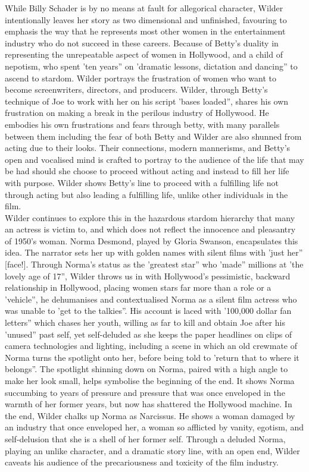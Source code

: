 \documentclass[a4paper]{article}
\begin{document}
While Billy Schader is by no means at fault for allegorical character, Wilder intentionally leaves her story as two dimensional and unfinished, favouring to emphasis the way that he represents most other women in the entertainment industry who do not succeed in these careers. Because of Betty’s duality in representing the unrepeatable aspect of women in Hollywood, and a child of nepotism, who spent 'ten years” on 'dramatic lessons, dictation and dancing” to ascend to stardom. Wilder portrays the frustration of women who want to become screenwriters, directors, and producers. Wilder, through Betty’s technique of Joe to work with her on his script 'bases loaded”, shares his own frustration on making a break in the perilous industry of Hollywood. He embodies his own frustrations and fears through betty, with many parallels between them including the fear of both Betty and Wilder are also shunned from acting due to their looks. Their connections, modern mannerisms, and Betty’s open and vocalised mind is crafted to portray to the audience of the life that may be had should she choose to proceed without acting and instead to fill her life with purpose. Wilder shows Betty’s line to proceed with a fulfilling life not through acting but also leading a fulfilling life, unlike other individuals in the film.\\

Wilder continues to explore this in the hazardous stardom hierarchy that many an actress is victim to, and which does not reflect the innocence and pleasantry of 1950’s woman. Norma Desmond, played by Gloria Swanson, encapsulates this idea. The narrator sets her up with golden names with silent films with 'just her” [face!]. Through Norma’s status as the 'greatest star” who 'made” millions at 'the lovely age of 17”, Wilder throws us in with Hollywood’s pessimistic, backward relationship in Hollywood, placing women stars far more than a role or a 'vehicle”, he dehumanises and contextualised Norma as a silent film actress who was unable to 'get to the talkies”. His account is laced with '100,000 dollar fan letters” which chases her youth, willing as far to kill and obtain Joe after his 'unused” past self, yet self-deluded as she keeps the paper headlines on clips of camera technologies and lighting, including a scene in which an old crewmate of Norma turns the spotlight onto her, before being told to 'return that to where it belongs”. The spotlight shinning down on Norma, paired with a high angle to make her look small, helps symbolise the beginning of the end. It shows Norma succumbing to years of pressure and pressure that was once enveloped in the warmth of her former years, but now has shattered the Hollywood machine. In the end, Wilder chalks up Norma as Narcissus. He shows a woman damaged by an industry that once enveloped her, a woman so afflicted by vanity, egotism, and self-delusion that she is a shell of her former self. Through a deluded Norma, playing an unlike character, and a dramatic story line, with an open end, Wilder caveats his audience of the precariousness and toxicity of the film industry.\\
\end{document}

